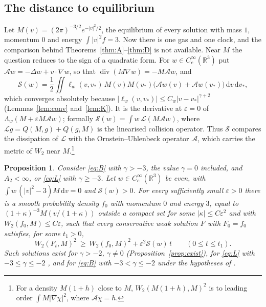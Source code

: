 \documentclass[11pt]{amsart}
\newtheorem{proposition}[theorem]{Proposition}
\theoremstyle{definition}
\newcommand{\RR}{\mathbb{R}}
\newcommand{\dd}{\,\mathrm{d}}
\begin{document}
\subsection{The distance to equilibrium}\label{sec:equilibrium}
Let $M(v)=(2\pi)^{-3/2}e^{-|v|^2/2}$, the equilibrium of every solution with mass $1$, momentum $0$ and energy $\int|v|^2f=3$. Now there is one gas and one clock, and the comparison behind Theorems~\ref{thm:A}--\ref{thm:D} is not available. Near $M$ the question reduces to the sign of a quadratic form. For $w\in C^\infty_c(\RR^3)$ put $\mathcal Aw=-\Delta w+v\cdot\nabla w$, so that $\operatorname{div}(M\nabla w)=-M\mathcal Aw$, and
\begin{equation}\label{eq:Sform}
\mathcal S(w)=\frac12\iint\ell_w(v,v_*)\,M(v)M(v_*)\big(\mathcal Aw(v)+\mathcal Aw(v_*)\big)\dd v\dd v_* ,
\end{equation}
which converges absolutely because $|\ell_w(v,v_*)|\le C_w|v-v_*|^{\gamma+2}$ (Lemmas~\ref{lem:conv} and~\ref{lem:K}). It is the derivative at $\varepsilon=0$ of $\Lambda_w(M+\varepsilon M\mathcal Aw)$; formally $\mathcal S(w)=\int w\,\mathcal L(M\mathcal Aw)$, where $\mathcal Lg=Q(M,g)+Q(g,M)$ is the linearised collision operator. Thus $\mathcal S$ compares the dissipation of $\mathcal L$ with the Ornstein--Uhlenbeck operator $\mathcal A$, which carries the metric of $W_2$ near $M$.\footnote{For a density $M(1+h)$ close to $M$, $W_2(M(1+h),M)^2$ is to leading order $\int M|\nabla\chi|^2$, where $\mathcal A\chi=h$.}

\begin{proposition}\label{prop:eq}
Consider \eqref{eq:B} with $\gamma>-3$, the value $\gamma=0$ included, and $A_2<\infty$, or \eqref{eq:L} with $\gamma\ge-3$. Let $w\in C^\infty_c(\RR^3)$ be even, with $\int w\,(|v|^2-3)M\dd v=0$ and $\mathcal S(w)>0$. For every sufficiently small $\varepsilon>0$ there is a smooth probability density $f_0$ with momentum $0$ and energy $3$, equal to $(1+\kappa)^{-3}M(v/(1+\kappa))$ outside a compact set for some $|\kappa|\le C\varepsilon^2$ and with $W_2(f_0,M)\le C\varepsilon$, such that every conservative weak solution $F$ with $F_0=f_0$ satisfies, for some $t_1>0$,
\[
W_2(F_t,M)^2\ \ge\ W_2(f_0,M)^2+\varepsilon^2\mathcal S(w)\,t\qquad(0\le t\le t_1).
\]
Such solutions exist for $\gamma>-2$, $\gamma\ne0$ (Proposition~\ref{prop:exist}), for \eqref{eq:L} with $-3\le\gamma\le-2$ \cite[Theorem~1.2]{GS25}, and for \eqref{eq:B} with $-3<\gamma\le-2$ under the hypotheses of \cite[Theorems~1.2 and~1.6]{ISV25}.
\end{proposition}
\end{document}
